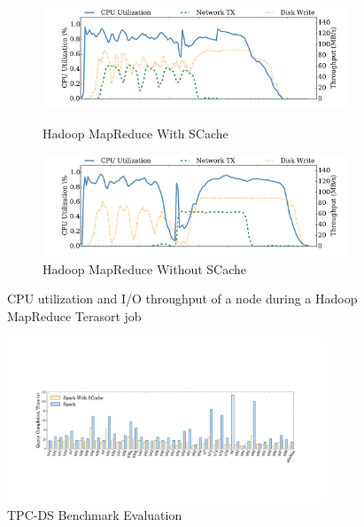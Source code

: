 \begin{figure}
	\centering
	\begin{minipage}[hb]{\linewidth}
		\begin{subfigure}{\linewidth}
			\begin{minipage}{\linewidth}
				\includegraphics[width=\linewidth]{fig/hadoop_terasort_scache}
				\caption{\color{black}Hadoop MapReduce With SCache}
				\label{fig:hadoop_terasort_scache}
			\end{minipage}
			\begin{minipage}{\linewidth}
				\includegraphics[width=\linewidth]{fig/hadoop_terasort_origin}
				\caption{\color{black}Hadoop MapReduce Without SCache}
				\label{fig:hadoop_terasort_origin}
			\end{minipage}
		\end{subfigure}
		\caption{\color{black}CPU utilization and I/O throughput of a node during a Hadoop MapReduce Terasort job}
		\label{fig:hadoop_terasort}
	\end{minipage}
\end{figure}
\begin{figure}
	\centering
	\includegraphics[width=0.85\textwidth]{fig/tpcds}
	\caption{TPC-DS Benchmark Evaluation}
	\label{fig:tpcds}
	\vspace{-1em}
\end{figure}
